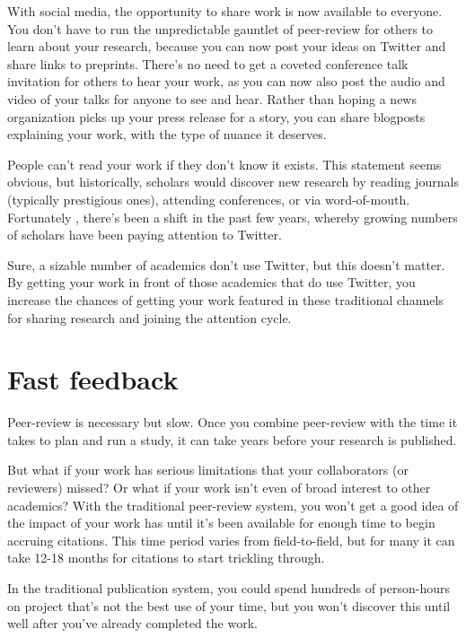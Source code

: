 \documentclass[
]{book}
\begin{document}
With social media, the opportunity to share work is now available to everyone. You don't have to run the unpredictable gauntlet of peer-review for others to learn about your research, because you can now post your ideas on Twitter and share links to preprints. There's no need to get a coveted conference talk invitation for others to hear your work, as you can now also post the audio and video of your talks for anyone to see and hear. Rather than hoping a news organization picks up your press release for a story, you can share blogposts explaining your work, with the type of nuance it deserves.

People can't read your work if they don't know it exists. This statement seems obvious, but historically, scholars would discover new research by reading journals (typically prestigious ones), attending conferences, or via word-of-mouth. Fortunately , there's been a shift in the past few years, whereby growing numbers of scholars have been paying attention to Twitter.

Sure, a sizable number of academics don't use Twitter, but this doesn't matter. By getting your work in front of those academics that do use Twitter, you increase the chances of getting your work featured in these traditional channels for sharing research and joining the attention cycle.

\hypertarget{fast-feedback}{%
\section*{Fast feedback}\label{fast-feedback}}

Peer-review is necessary but slow. Once you combine peer-review with the time it takes to plan and run a study, it can take years before your research is published.

But what if your work has serious limitations that your collaborators (or reviewers) missed? Or what if your work isn't even of broad interest to other academics? With the traditional peer-review system, you won't get a good idea of the impact of your work has until it's been available for enough time to begin accruing citations. This time period varies from field-to-field, but for many it can take 12-18 months for citations to start trickling through.

In the traditional publication system, you could spend hundreds of person-hours on project that's not the best use of your time, but you won't discover this until well after you've already completed the work.
\end{document}
